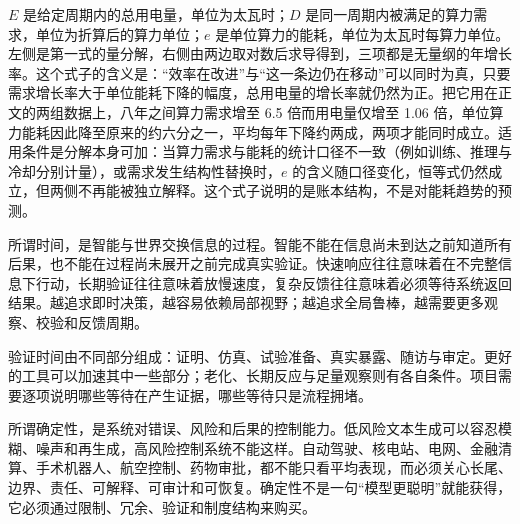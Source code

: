 $E$ 是给定周期内的总用电量，单位为太瓦时；$D$ 是同一周期内被满足的算力需求，单位为折算后的算力单位；$e$ 是单位算力的能耗，单位为太瓦时每算力单位。左侧是第一式的量分解，右侧由两边取对数后求导得到，三项都是无量纲的年增长率。这个式子的含义是：“效率在改进”与“这一条边仍在移动”可以同时为真，只要需求增长率大于单位能耗下降的幅度，总用电量的增长率就仍然为正。把它用在正文的两组数据上，八年之间算力需求增至 6.5 倍而用电量仅增至 1.06 倍，单位算力能耗因此降至原来的约六分之一，平均每年下降约两成，两项才能同时成立。适用条件是分解本身可加：当算力需求与能耗的统计口径不一致（例如训练、推理与冷却分别计量），或需求发生结构性替换时，$e$ 的含义随口径变化，恒等式仍然成立，但两侧不再能被独立解释。这个式子说明的是账本结构，不是对能耗趋势的预测。

所谓时间，是智能与世界交换信息的过程。智能不能在信息尚未到达之前知道所有后果，也不能在过程尚未展开之前完成真实验证。快速响应往往意味着在不完整信息下行动，长期验证往往意味着放慢速度，复杂反馈往往意味着必须等待系统返回结果。越追求即时决策，越容易依赖局部视野；越追求全局鲁棒，越需要更多观察、校验和反馈周期。

验证时间由不同部分组成：证明、仿真、试验准备、真实暴露、随访与审定。更好的工具可以加速其中一些部分；老化、长期反应与足量观察则有各自条件。项目需要逐项说明哪些等待在产生证据，哪些等待只是流程拥堵。

所谓确定性，是系统对错误、风险和后果的控制能力。低风险文本生成可以容忍模糊、噪声和再生成，高风险控制系统不能这样。自动驾驶、核电站、电网、金融清算、手术机器人、航空控制、药物审批，都不能只看平均表现，而必须关心长尾、边界、责任、可解释、可审计和可恢复。确定性不是一句“模型更聪明”就能获得，它必须通过限制、冗余、验证和制度结构来购买。

